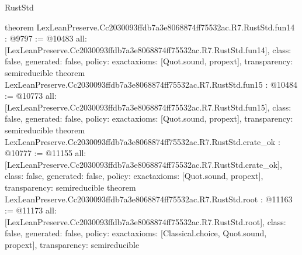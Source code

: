 \begin{lexlean}{RustStd}
\begin{coremodule}
{}
theorem LexLeanPreserve.Cc2030093ffdb7a3e8068874ff75532ac.R7.RustStd.fun14 : @9797 := @10483 {
  all: [LexLeanPreserve.Cc2030093ffdb7a3e8068874ff75532ac.R7.RustStd.fun14],
  class: false,
  generated: false,
  policy: exact{axioms: [Quot.sound, propext]},
  transparency: semireducible
}
theorem LexLeanPreserve.Cc2030093ffdb7a3e8068874ff75532ac.R7.RustStd.fun15 : @10484 := @10773 {
  all: [LexLeanPreserve.Cc2030093ffdb7a3e8068874ff75532ac.R7.RustStd.fun15],
  class: false,
  generated: false,
  policy: exact{axioms: [Quot.sound, propext]},
  transparency: semireducible
}
theorem LexLeanPreserve.Cc2030093ffdb7a3e8068874ff75532ac.R7.RustStd.crate_ok : @10777 := @11155 {
  all: [LexLeanPreserve.Cc2030093ffdb7a3e8068874ff75532ac.R7.RustStd.crate_ok],
  class: false,
  generated: false,
  policy: exact{axioms: [Quot.sound, propext]},
  transparency: semireducible
}
theorem LexLeanPreserve.Cc2030093ffdb7a3e8068874ff75532ac.R7.RustStd.root : @11163 := @11173 {
  all: [LexLeanPreserve.Cc2030093ffdb7a3e8068874ff75532ac.R7.RustStd.root],
  class: false,
  generated: false,
  policy: exact{axioms: [Classical.choice, Quot.sound, propext]},
  transparency: semireducible
}


\end{coremodule}
\end{lexlean}
